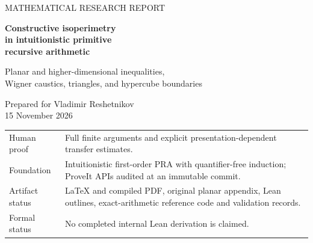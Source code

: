 \documentclass[11pt,a4paper]{article}
\theoremstyle{definition}
\begin{document}
\hypersetup{pageanchor=false}
\begin{titlepage}
\vspace*{12mm}
{\color{blue!45!black}\large MATHEMATICAL RESEARCH REPORT\par}
\vspace{7mm}
{\LARGE\bfseries Constructive isoperimetry\\[3mm]
in intuitionistic primitive\\[3mm] recursive arithmetic\par}
\vspace{9mm}
{\large Planar and higher-dimensional inequalities,\\
Wigner caustics, triangles, and hypercube boundaries\par}
\vspace{10mm}
Prepared for Vladimir Reshetnikov\\
15 November 2026
\vspace{8mm}
\begin{abstract}
We develop constructive versions of the mathematical statements in the
Wikipedia article \emph{Isoperimetric inequality}. The finite core consists
of explicit rational or integer inequalities: polygonal isoperimetry,
both triangle inequalities, a rational-parameter Brunn--Minkowski theorem
for finite unions of boxes, Fourier deficit identities, the sharp hypercube
edge inequality, and the full Harper vertex theorem. The proof of the box
theorem uses exact rational volume cuts with a bounded recursion; the
hypercube proof includes the exceptional compressed families.

The finite results extend to specified primitive recursive geometric
presentations, with all approximation and regularity hypotheses stated.
These yield the sharp planar inequality and circle rigidity, the
Wigner-caustic improvement and constant-width equality, sharp Euclidean
isoperimetry with an outer-volume modulus, a finite layered Sobolev theorem,
and spherical inequalities for finite unions of caps and their complements.
We distinguish these results from unrestricted classical claims that this
report does not prove. The Lean contribution specifies finite definitions,
internal iPRA proof targets, and a concrete completion path; it is an
uncompiled outline rather than a finished formal proof.
\end{abstract}
\vfill
\begin{tabular}{@{}p{}p{}@{}}
\toprule
Human proof & Full finite arguments and explicit presentation-dependent
transfer estimates.\\
Foundation & Intuitionistic first-order PRA with quantifier-free induction;
ProveIt APIs audited at an immutable commit.\\
Artifact status & LaTeX and compiled PDF, original planar appendix,
Lean outlines, exact-arithmetic reference code and validation records.\\
Formal status & No completed internal Lean derivation is claimed.\\
\bottomrule
\end{tabular}
\end{titlepage}
\hypersetup{pageanchor=true}
\end{document}
